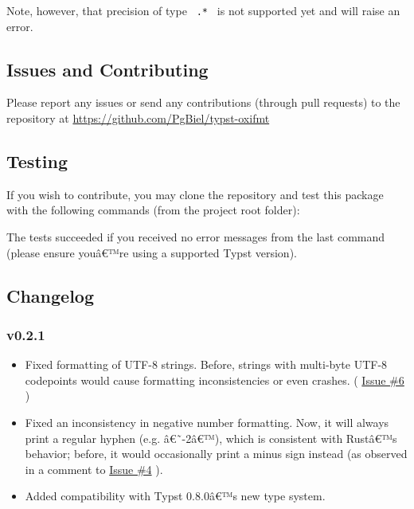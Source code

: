 Note, however, that precision of type \texttt{\ .*\ } is not supported
yet and will raise an error.

\subsection{Issues and Contributing}\label{issues-and-contributing}

Please report any issues or send any contributions (through pull
requests) to the repository at
\url{https://github.com/PgBiel/typst-oxifmt}

\subsection{Testing}\label{testing}

If you wish to contribute, you may clone the repository and test this
package with the following commands (from the project root folder):

\begin{Shaded}
\begin{Highlighting}[]
\end{Highlighting}
\end{Shaded}

The tests succeeded if you received no error messages from the last
command (please ensure youâ€™re using a supported Typst version).

\subsection{Changelog}\label{changelog}

\subsubsection{v0.2.1}\label{v0.2.1}

\begin{itemize}
\tightlist
\item
  Fixed formatting of UTF-8 strings. Before, strings with multi-byte
  UTF-8 codepoints would cause formatting inconsistencies or even
  crashes. (
  \href{https://github.com/PgBiel/typst-oxifmt/issues/6}{Issue \#6} )
\item
  Fixed an inconsistency in negative number formatting. Now, it will
  always print a regular hyphen (e.g. â€˜-2â€™), which is consistent
  with Rustâ€™s behavior; before, it would occasionally print a minus
  sign instead (as observed in a comment to
  \href{https://github.com/PgBiel/typst-oxifmt/issues/4}{Issue \#4} ).
\item
  Added compatibility with Typst 0.8.0â€™s new type system.
\end{itemize}

